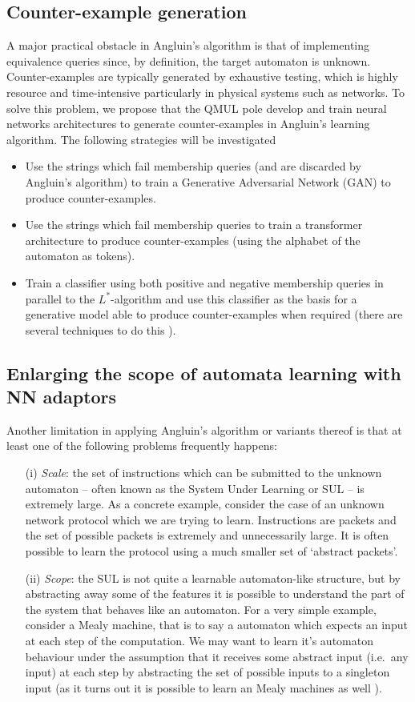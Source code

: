 \documentclass[11pt,a4paper]{article}
\begin{document}
		\subsection{Counter-example generation}
		A major practical obstacle in Angluin's algorithm is that of implementing equivalence queries since, by definition, the target automaton is unknown. Counter-examples are typically generated by exhaustive testing, which is highly resource and time-intensive particularly in physical systems such as networks. To solve this problem, we propose that the  QMUL pole develop and train neural networks architectures to generate counter-examples in Angluin's learning algorithm. The following strategies will be investigated
		\begin{itemize}
			\item Use the strings which fail membership queries (and are discarded by Angluin's algorithm) to train a Generative Adversarial Network (GAN) to produce counter-examples.
			\item Use the strings which fail membership queries to train a transformer architecture to produce counter-examples (using the alphabet of the automaton as tokens).
			\item Train a classifier using both positive and negative membership queries in parallel to the $L^\ast$-algorithm and use this classifier as the basis for a generative model able to produce counter-examples when required (there are several techniques to do this \cite{?}).
		\end{itemize}
		
		
		\subsection{Enlarging the scope of automata learning with NN adaptors}
		Another limitation in applying Angluin's algorithm or variants thereof is that at least one of the following problems frequently happens:
		\begin{itemize}
			\item[(i)] \emph{Scale}: the set of instructions which can be submitted to the unknown automaton -- often known as the System Under Learning or SUL -- is extremely large. As a concrete example, consider the case of an unknown network protocol which we are trying to learn. Instructions are packets and the set of possible packets is extremely and unnecessarily large. It is often possible to learn the protocol using a much smaller set of `abstract packets'.
			\item[(ii)] \emph{Scope}: the SUL is not quite a learnable automaton-like structure, but by abstracting away some of the features it is possible to understand the part of the system that behaves like an automaton. For a very simple example, consider a Mealy machine, that is to say a automaton which expects an input at each step of the computation. We may want to learn it's automaton behaviour under the assumption that it receives some abstract input (i.e.\ any input) at each step by abstracting the set of possible inputs to a singleton input (as it turns out it is possible to learn an Mealy machines as well \cite{}).
		\end{itemize}
		
\end{document}
